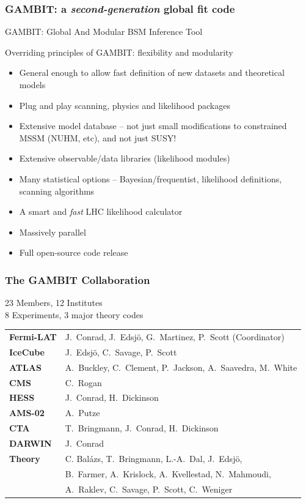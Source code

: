 \documentclass[xcolor=dvipsnames]{beamer}
\begin{document}
\begin{frame}
\frametitle{\textbf{GAMBIT}: a \textit{second-generation} global fit code}

GAMBIT: \alert{G}lobal \alert{A}nd \alert{M}odular \alert{B}SM \alert{I}nference \alert{T}ool
\vspace{5mm}

Overriding principles of GAMBIT: flexibility and modularity
\begin{itemize}
\item General enough to allow fast definition of new datasets and theoretical models
\item Plug and play scanning, physics and likelihood packages
\item Extensive model database -- not just small modifications to constrained MSSM (NUHM, etc), and not just SUSY!
\item Extensive observable/data libraries (likelihood modules)
\item Many statistical options -- Bayesian/frequentist, likelihood definitions, scanning algorithms
\item A smart and \textit{fast} LHC likelihood calculator
\item Massively parallel
\item Full open-source code release
\end{itemize}

\end{frame}


\begin{frame}
\frametitle{The GAMBIT Collaboration}

23 Members, 12 Institutes \\
8 Experiments, 3 major theory codes \vspace{3mm}

\begin{tabular}{l l}
\textbf{Fermi-LAT} & \small J.\ Conrad, J.\ Edsj\"o, G.\ Martinez, P.\ Scott {\tiny(Coordinator)}\\
\textbf{IceCube} & \small J.\ Edsj\"o, C.\ Savage, P.\ Scott\\
\textbf{ATLAS} & \small A.\ Buckley, C.\ Clement, P.\ Jackson, A.\ Saavedra, M.\ White\\
\textbf{CMS} & \small C.\ Rogan\\
\textbf{HESS} & \small J.\ Conrad, H.\ Dickinson \\
\textbf{AMS-02} & \small A.\ Putze\\
\textbf{CTA} & \small T.\ Bringmann, J.\ Conrad, H.\ Dickinson\\
\textbf{DARWIN} & \small J.\ Conrad\\
\textbf{Theory} & \small C. Bal\'azs, T.\ Bringmann, L.-A.\ Dal, J.\ Edsj\"o, \\
                & \small B.\ Farmer, A.\ Krislock, A.\ Kvellestad, N.\ Mahmoudi, \\
                & \small A.\ Raklev, C.\ Savage, P.\ Scott, C.\ Weniger \\	
\end{tabular}

\end{frame}
\end{document}
